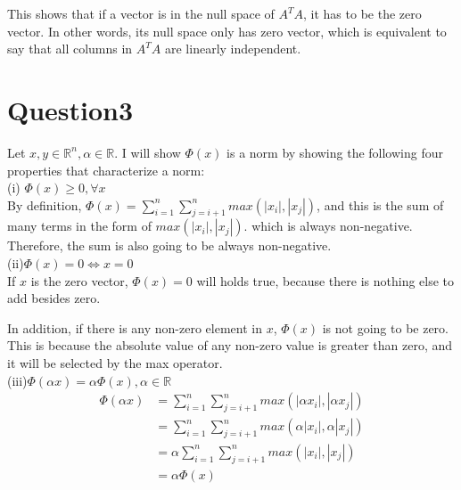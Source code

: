 \documentclass[paper=a4, fontsize=11pt]{scrartcl} %
\numberwithin{equation}{section} %
\numberwithin{figure}{section} %
\numberwithin{table}{section} %
\begin{document}
This shows that if a vector is in the null space of $A^T A$, it has to be the zero vector. In other words, its null space only has zero vector, which is equivalent to say that all columns in $A^T A$ are linearly independent. 


\newpage
\section*{Question3}

Let $x,y \in \mathbb{R}^n, \alpha\in\mathbb{R}$. I will show $\Phi(x)$ is a norm by showing the following four properties that characterize a norm: \\

(i) $\Phi(x) \geq 0, \forall x$ \\ 
By definition, $\Phi(x) = \displaystyle\sum_{i=1}^{n} \displaystyle\sum_{j=i+1}^{n} max(|x_i|,|x_j|)$, and this is the sum of many terms in the form of $max(|x_i|,|x_j|)$. which is always non-negative. Therefore, the sum is also going to be always non-negative. \\

(ii)$\Phi(x) = 0 \iff x = 0 $ \\ 
If $x$ is the zero vector, $\Phi(x) = 0$ will holds true, because there is nothing else to add besides zero. 

In addition, if there is any non-zero element in $x$, $\Phi(x)$ is not going to be zero. This is because the absolute value of any non-zero value is greater than zero, and it will be selected by the max operator. \\

(iii)$\Phi(\alpha x)=\alpha\Phi(x),\alpha\in\mathbb{R}$
\begin{equation*} \label{eq1}
\begin{split}
 \Phi(\alpha x) & 
 = \displaystyle\sum_{i=1}^{n} \displaystyle\sum_{j=i+1}^{n} max(|\alpha x_i|,|\alpha x_j|) \\ 
  & = \displaystyle\sum_{i=1}^{n} \displaystyle\sum_{j=i+1}^{n} max(\alpha |x_i|, \alpha |x_j|) \\ 
  & = \alpha  \displaystyle\sum_{i=1}^{n} \displaystyle\sum_{j=i+1}^{n} max(|x_i|, |x_j|) \\   
 & = \alpha \Phi(x)  
\end{split}
\end{equation*}
\end{document}
